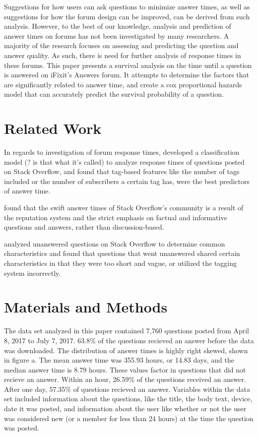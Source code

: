\documentclass[12pt]{article}
\begin{document}
    Suggestions for how users can ask questions to minimize answer times, as well as suggestions for how the forum design can be improved, can be derived from such analysis. However, to the best of our knowledge, analysis and prediction of answer times on forums has not been investigated by many researchers. A majority of the research focuses on assessing and predicting the question and answer quality. As such, there is need for further analysis of response times in these forums. This paper presents a survival analysis on the time until a question is answered on iFixit's Answers forum. It attempts to determine the factors that are significantly related to answer time, and create a cox proportional hazards model that can accurately predict the survival probability of a question.

\section{Related Work}

    In regards to investigation of forum response times, \citep{Bhat2014} developed a classification model (? is that what it's called) to analyze response times of questions posted on Stack Overflow, and found that tag-based features like the number of tags included or the number of subscribers a certain tag has, were the best predictors of answer time. 

    \citep{Mamykina2011} found that the swift answer times of Stack Overflow's community is a result of the reputation system and the strict emphasis on factual and informative questions and answers, rather than discussion-based. 

    \citep{Asaduzzaman2013} analyzed unanswered questions on Stack Overflow to determine common characteristics and found that questions that went unanswered shared certain characteristics in that they were too short and vague, or utilized the tagging system incorrectly. 

\section{Materials and Methods}

    The data set analyzed in this paper contained 7,760 questions posted from April 8, 2017 to July 7, 2017. 63.8\% of the questions recieved an answer before the data was downloaded. The distribution of answer times is highly right skewed, shown in figure a. The mean answer time was 355.93 hours, or 14.83 days, and the median answer time is 8.79 hours. These values factor in questions that did not recieve an answer. Within an hour, 26.59\% of the questions received an answer. After one day, 57.35\% of questions recieved an answer. Variables within the data set included information about the questions, like the title, the body text, device, date it was posted, and information about the user like whether or not the user was considered new (or a member for less than 24 hours) at the time the question was posted. 
    
\end{document}
